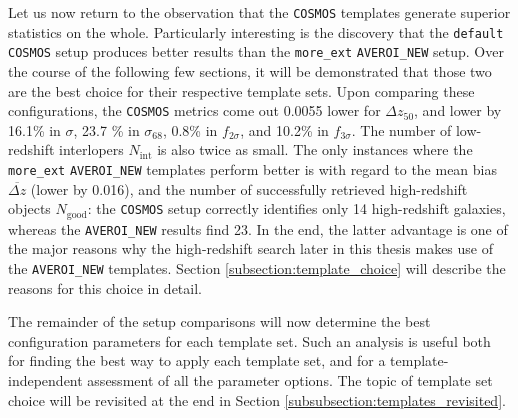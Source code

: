 Let us now return to the observation that the \texttt{COSMOS} templates generate superior statistics on the whole. Particularly interesting is the discovery that the \texttt{default} \texttt{COSMOS} setup produces better results than the \texttt{more\_ext} \texttt{AVEROI\_NEW} setup. Over the course of the following few sections, it will be demonstrated that those two are the best choice for their respective template sets. Upon comparing these configurations, the \texttt{COSMOS} metrics come out 0.0055 lower for $\Delta z_{50}$, and lower by 16.1\% in $\sigma$, 23.7 \% in $\sigma_{68}$, 0.8\% in $f_{2\sigma}$, and 10.2\% in $f_{3\sigma}$. The number of low-redshift interlopers $N_{\mathrm{int}}$ is also twice as small. The only instances where the \texttt{more\_ext} \texttt{AVEROI\_NEW} templates perform better is with regard to the mean bias $\overbar{\Delta z}$ (lower by 0.016), and the number of successfully retrieved high-redshift objects $N_{\mathrm{good}}$: the \texttt{COSMOS} setup correctly identifies only 14 high-redshift galaxies, whereas the \texttt{AVEROI\_NEW} results find 23. In the end, the latter advantage is one of the major reasons why the high-redshift search later in this thesis makes use of the \texttt{AVEROI\_NEW} templates. Section \ref{subsection:template_choice} will describe the reasons for this choice in detail. \par

The remainder of the setup comparisons will now determine the best configuration parameters for each template set. Such an analysis is useful both for finding the best way to apply each template set, and for a template-independent assessment of all the parameter options. The topic of template set choice will be revisited at the end in Section \ref{subsubsection:templates_revisited}.\par %




